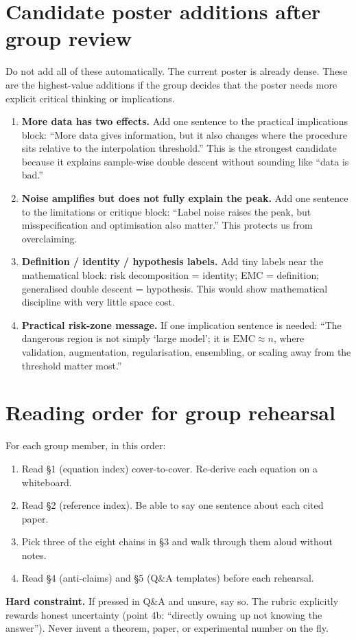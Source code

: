 \documentclass[11pt,a4paper]{article}
\theoremstyle{definition}
\begin{document}
\section{Candidate poster additions after group review}

Do not add all of these automatically. The current poster is already dense. These are the highest-value additions if the group decides that the poster needs more explicit critical thinking or implications.

\begin{enumerate}[leftmargin=1.4em]
\item \textbf{More data has two effects.} Add one sentence to the practical implications block: ``More data gives information, but it also changes where the procedure sits relative to the interpolation threshold.'' This is the strongest candidate because it explains sample-wise double descent without sounding like ``data is bad.''
\item \textbf{Noise amplifies but does not fully explain the peak.} Add one sentence to the limitations or critique block: ``Label noise raises the peak, but misspecification and optimisation also matter.'' This protects us from overclaiming.
\item \textbf{Definition / identity / hypothesis labels.} Add tiny labels near the mathematical block: risk decomposition = identity; EMC = definition; generalised double descent = hypothesis. This would show mathematical discipline with very little space cost.
\item \textbf{Practical risk-zone message.} If one implication sentence is needed: ``The dangerous region is not simply `large model'; it is $\mathrm{EMC}\approx n$, where validation, augmentation, regularisation, ensembling, or scaling away from the threshold matter most.''
\end{enumerate}

\section{Reading order for group rehearsal}

For each group member, in this order:
\begin{enumerate}[leftmargin=1.4em]
\item Read \S1 (equation index) cover-to-cover. Re-derive each equation on a whiteboard.
\item Read \S2 (reference index). Be able to say one sentence about each cited paper.
\item Pick three of the eight chains in \S3 and walk through them aloud without notes.
\item Read \S4 (anti-claims) and \S5 (Q\&A templates) before each rehearsal.
\end{enumerate}

\noindent\textbf{Hard constraint.} If pressed in Q\&A and unsure, say so. The rubric explicitly rewards honest uncertainty (point 4b: ``directly owning up not knowing the answer''). Never invent a theorem, paper, or experimental number on the fly.
\end{document}
